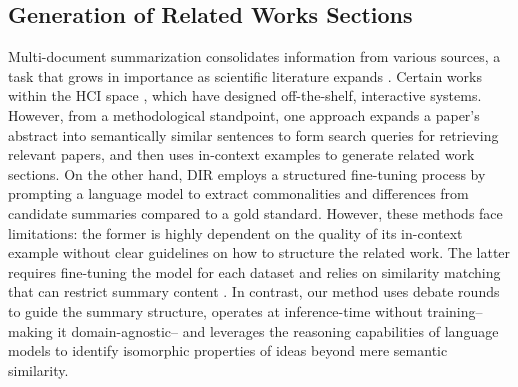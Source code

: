 \subsection{Generation of Related Works Sections} 
\par Multi-document summarization consolidates information from various sources, a task that grows in importance as scientific literature expands \cite{comparative_graph}. Certain works within the HCI space \cite{palani2023relatedly,lee2024paperweaver}, which have designed off-the-shelf, interactive systems. However, from a methodological standpoint, one approach \cite{ur3wg} expands a paper's abstract into semantically similar sentences to form search queries for retrieving relevant papers, and then uses in-context examples to generate related work sections. On the other hand, DIR \cite{dir} employs a structured fine-tuning process by prompting a language model to extract commonalities and differences from candidate summaries compared to a gold standard. However, these methods face limitations: the former is highly dependent on the quality of its in-context example without clear guidelines on how to structure the related work. The latter requires fine-tuning the model for each dataset and relies on similarity matching that can restrict summary content \cite{contribution_sum, whats_new}. In contrast, our method uses debate rounds to guide the summary structure, operates at inference-time without training-- making it domain-agnostic-- and leverages the reasoning capabilities of language models to identify isomorphic properties of ideas beyond mere semantic similarity.